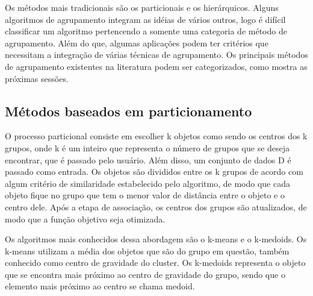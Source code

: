 Os métodos mais tradicionais são os particionais e os hierárquicos. Alguns algoritmos de agrupamento integram as idéias de vários outros, logo é difícil classificar um algoritmo pertencendo a somente uma categoria de método de agrupamento. Além do que, algumas aplicações podem ter critérios que necessitam a integração de várias técnicas de agrupamento.  Os principais métodos de agrupamento existentes na literatura podem ser categorizados, como mostra as próximas sessões.

\subsection{Métodos baseados em particionamento}
O processo particional consiste em escolher k objetos como sendo os centros dos k grupos, onde k  é um inteiro que representa o número de grupos que se deseja encontrar, que é passado pelo usuário. Além disso, um conjunto de dados D é passado como entrada. 
Os objetos são divididos entre os k grupos de acordo com algum critério de similaridade
estabelecido pelo algoritmo, de modo que cada objeto fique no grupo que tem o menor valor de
distância entre o objeto e o centro dele.
Após a etapa de associação, os centros dos grupos são atualizados, de modo que a função objetivo seja otimizada.

Os algoritmos mais conhecidos dessa abordagem são o k-means e o k-medoids.
Os k-means utilizam a média dos objetos que são do grupo em questão, também conhecido como centro de gravidade do cluster. Os k-medoids representa o objeto que se encontra mais próximo ao centro de gravidade do grupo,
sendo que o elemento mais próximo ao centro se chama medoid.


